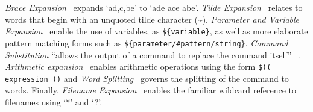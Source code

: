 \emph{Brace Expansion}~\cite{brace_expansion} expands `a{d,c,b}e' to `ade ace abe'. \emph{Tilde Expansion}~\cite{tilde_expansion} relates to words that begin with an unquoted tilde character (\textasciitilde). \emph{Parameter and Variable Expansion}~\cite{shell_parameter_expansion} enable the use of variables, as \texttt{\$\{variable\}}, as well as more elaborate pattern matching forms such as \texttt{\$\{parameter/\#pattern/string\}}. \emph{Command Substitution} \enquote{allows the output of a command to replace the command itself} ~\cite{command_substitution}. \emph{Arithmetic expansion}~\cite{arithmetic_expansion} enables arithmetic operations using the form \texttt{\$(( expression ))} and \emph{Word Splitting}~\cite{word_splitting} governs the splitting of the command to words. Finally, \emph{Filename Expansion}~\cite{filename_expansion} enables the familiar wildcard reference to filenames using `*' and `?'.